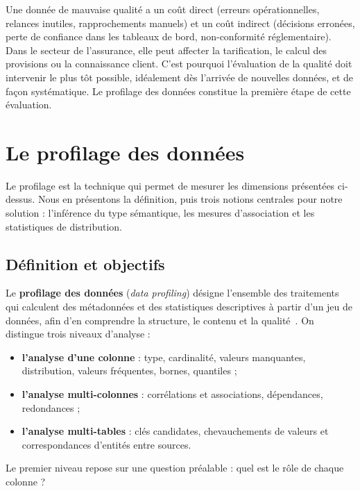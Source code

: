 Une donnée de mauvaise qualité a un coût direct (erreurs opérationnelles, relances inutiles, rapprochements manuels) et un coût indirect (décisions erronées, perte de confiance dans les tableaux de bord, non-conformité réglementaire). Dans le secteur de l'assurance, elle peut affecter la tarification, le calcul des provisions ou la connaissance client. C'est pourquoi l'évaluation de la qualité doit intervenir le plus tôt possible, idéalement dès l'arrivée de nouvelles données, et de façon systématique. Le profilage des données constitue la première étape de cette évaluation.

\section{Le profilage des données}

Le profilage est la technique qui permet de mesurer les dimensions présentées ci-dessus. Nous en présentons la définition, puis trois notions centrales pour notre solution : l'inférence du type sémantique, les mesures d'association et les statistiques de distribution.

\subsection{Définition et objectifs}

Le \textbf{profilage des données} (\textit{data profiling}) désigne l'ensemble des traitements qui calculent des métadonnées et des statistiques descriptives à partir d'un jeu de données, afin d'en comprendre la structure, le contenu et la qualité~\cite{abedjan}. On distingue trois niveaux d'analyse :
\begin{itemize}
  \item \textbf{l'analyse d'une colonne} : type, cardinalité, valeurs manquantes, distribution, valeurs fréquentes, bornes, quantiles ;
  \item \textbf{l'analyse multi-colonnes} : corrélations et associations, dépendances, redondances ;
  \item \textbf{l'analyse multi-tables} : clés candidates, chevauchements de valeurs et correspondances d'entités entre sources.
\end{itemize}

Le premier niveau repose sur une question préalable : quel est le rôle de chaque colonne ?


